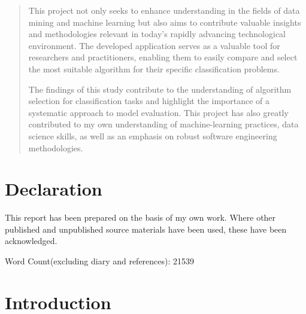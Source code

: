 \documentclass[letterpaper,10pt]{article}
\begin{document}
\begin{abstract}
This project not only seeks to enhance understanding in the fields of data mining and machine learning but also aims to contribute valuable insights and methodologies relevant in today's rapidly advancing technological environment. The developed application serves as a valuable tool for researchers and practitioners, enabling them to easily compare and select the most suitable algorithm for their specific classification problems. \par

The findings of this study contribute to the understanding of algorithm selection for classification tasks and highlight the importance of a systematic approach to model evaluation. This project has also greatly contributed to my own understanding of machine-learning practices, data science skills, as well as an emphasis on robust software engineering methodologies. 

\end{abstract}
\newpage
\setcounter{tocdepth}{2}
\tableofcontents

\newpage
\section*{Declaration}
This report has been prepared on the basis of my own work. Where other published and unpublished source materials have been used, these have been acknowledged.\par

Word Count(excluding diary and references): 21539 





\newpage
\section{Introduction}
\end{document}
